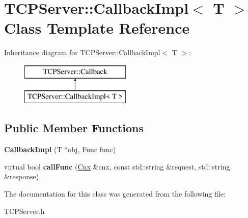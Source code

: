 \hypertarget{classTCPServer_1_1CallbackImpl}{\section{T\-C\-P\-Server\-:\-:Callback\-Impl$<$ T $>$ Class Template Reference}
\label{classTCPServer_1_1CallbackImpl}
}
Inheritance diagram for T\-C\-P\-Server\-:\-:Callback\-Impl$<$ T $>$\-:\begin{figure}[H]
\begin{center}
\leavevmode
\includegraphics[height=2.000000cm]{classTCPServer_1_1CallbackImpl}
\end{center}
\end{figure}
\subsection*{Public Member Functions}
\begin{DoxyCompactItemize}
\item 
\hypertarget{classTCPServer_1_1CallbackImpl_a39abe4ac0e2782d2ec0504a01fcdeb1e}{{\bfseries Callback\-Impl} (T $\ast$obj, Func func)}\label{classTCPServer_1_1CallbackImpl_a39abe4ac0e2782d2ec0504a01fcdeb1e}

\item 
\hypertarget{classTCPServer_1_1CallbackImpl_a7370ad2f2dc50df8f623480f1991381b}{virtual bool {\bfseries call\-Func} (\hyperlink{classTCPServer_1_1Cnx}{Cnx} \&cnx, const std\-::string \&request, std\-::string \&response)}\label{classTCPServer_1_1CallbackImpl_a7370ad2f2dc50df8f623480f1991381b}

\end{DoxyCompactItemize}


The documentation for this class was generated from the following file\-:\begin{DoxyCompactItemize}
\item 
T\-C\-P\-Server.\-h\end{DoxyCompactItemize}
